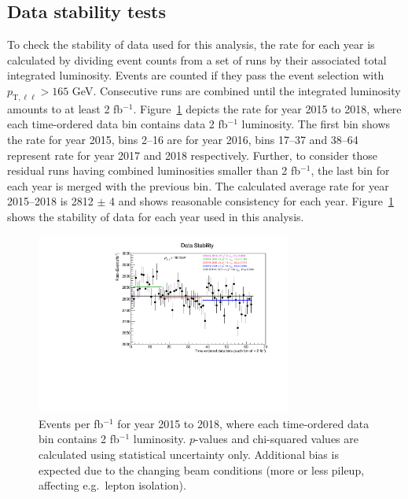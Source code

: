 \subsection{Data stability tests}
\label{sec:data-stability}
To check the stability of data used for this analysis, the rate for each year is calculated by dividing event counts from a set of runs by their associated total integrated luminosity. Events are counted if they pass the event selection with $p_{\text{T},\ell\ell}>165$ GeV. Consecutive runs are combined until the integrated luminosity amounts to at least 2 fb$^{-1}$. Figure~\ref{fig:DataStability} depicts the rate for year 2015 to 2018, where each time-ordered data bin contains data 2 fb$^{-1}$ luminosity. The first bin shows the rate for year 2015, bins 2--16 are for year 2016, bins 17--37 and 38--64 represent rate for year 2017 and 2018 respectively. Further, to consider those residual runs having combined luminosities smaller than 2 fb$^{-1}$, the last bin for each year is merged with the previous bin. The calculated average rate for year 2015--2018 is 2812 $\pm$ 4 and shows reasonable consistency for each year. Figure~\ref{fig:DataStability} shows the stability of data for each year used in this analysis.
\begin{figure}[h!]
  \centering
  \includegraphics[width=0.75\textwidth]{figures/DataStability.pdf}
  \caption{Events per fb$^{-1}$ for year 2015 to 2018, where each time-ordered data bin contains 2 fb$^{-1}$ luminosity.
    $p$-values and chi-squared values are calculated using statistical uncertainty only. Additional bias is expected due to the changing beam conditions (more or less pileup, affecting e.g.\ lepton isolation).
  }
  \label{fig:DataStability}
\end{figure}


